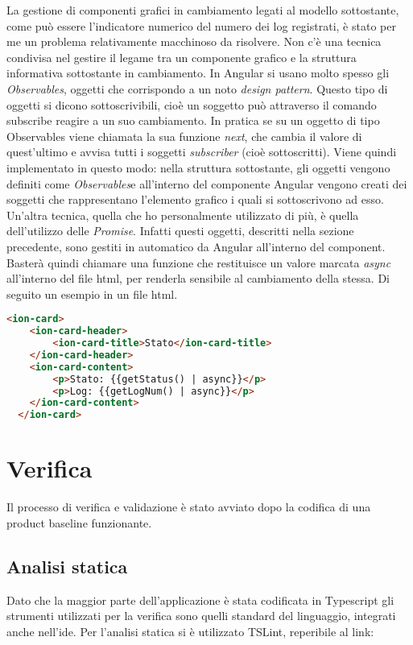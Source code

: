 La gestione di componenti grafici in cambiamento legati al modello sottostante, come può essere l'indicatore numerico
del numero dei log registrati, è stato per me un problema relativamente macchinoso da risolvere. Non c'è una tecnica
condivisa nel gestire il legame tra un componente grafico e la struttura informativa sottostante in cambiamento. In
Angular si usano molto spesso gli \textit{Observables}, oggetti che corrispondo a un noto \textit{design pattern}.
Questo tipo di oggetti si dicono sottoscrivibili, cioè un soggetto può attraverso il comando subscribe reagire a un suo
cambiamento. In pratica se su un oggetto di tipo Observables viene chiamata la sua funzione \textit{next}, che cambia il
valore di quest'ultimo e avvisa tutti i soggetti \textit{subscriber} (cioè sottoscritti). Viene quindi implementato in
questo modo: nella struttura sottostante, gli oggetti vengono definiti come \textit{Observables}e  all'interno del
componente Angular vengono creati dei soggetti che rappresentano l'elemento grafico i quali si sottoscrivono ad esso. \\
Un'altra tecnica, quella che ho personalmente utilizzato di più, è quella dell'utilizzo delle \textit{Promise}. Infatti
questi oggetti, descritti nella sezione precedente, sono gestiti in automatico da Angular all'interno del component.
Basterà quindi chiamare una funzione che restituisce un valore marcata \textit{async} all'interno del file
\acrshort{html}, per renderla sensibile al cambiamento della stessa. Di seguito un esempio in un file \acrshort{html}.
\begin{lstlisting}[language=html]
  <ion-card>
    <ion-card-header>
        <ion-card-title>Stato</ion-card-title>
    </ion-card-header>
    <ion-card-content>
        <p>Stato: {{getStatus() | async}}</p>
        <p>Log: {{getLogNum() | async}}</p>
    </ion-card-content>
  </ion-card>
\end{lstlisting}

\section{Verifica}
Il processo di verifica e validazione è stato avviato dopo la codifica di una \gls{product baseline} funzionante. 
\subsection{Analisi statica}
Dato che la maggior parte dell'applicazione è stata codificata in Typescript gli strumenti utilizzati per la verifica sono quelli standard
del linguaggio, integrati anche nell'\gls{ide}. Per l'analisi statica si è utilizzato TSLint, reperibile al link: \\
\begin{center}
  \cite{site:tslint}
\end{center}
